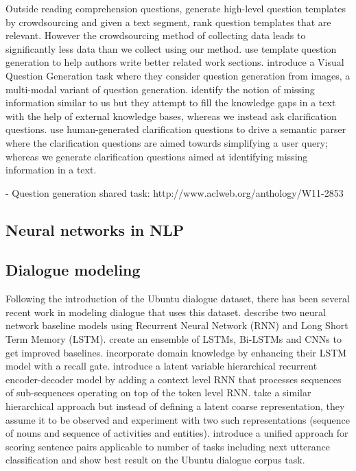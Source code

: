 \documentclass[11pt]{article}
\begin{document}
Outside reading comprehension questions, \cite{labutov2015deep} generate high-level question templates by crowdsourcing and given a text segment, rank question templates that are relevant. However the crowdsourcing method of collecting data leads to significantly less data than we collect using our method. \cite{liu2010automatic} use template question generation to help authors write better related work sections. \cite{mostafazadeh2016generating} introduce a Visual Question Generation task where they consider question generation from images, a multi-modal variant of question generation. 
\cite{penas2010filling} identify the notion of missing information similar to us but they attempt to fill the knowledge gaps in a text with the help of external knowledge bases, whereas we instead ask clarification questions. \cite{artzi2011bootstrapping} use human-generated clarification questions to drive a semantic parser where the clarification questions are aimed towards simplifying a user query; whereas we generate clarification questions aimed at  identifying missing information in a text. 

- Question generation shared task: http://www.aclweb.org/anthology/W11-2853

\subsection{Neural networks in NLP}

\subsection{Dialogue modeling}

Following the introduction of the Ubuntu dialogue dataset, there has been several recent work in modeling dialogue that uses this dataset. \cite{DBLP:conf/sigdial/LowePSP15} describe two neural network baseline models using Recurrent Neural Network (RNN) and Long Short Term Memory (LSTM). 
\cite{DBLP:journals/corr/KadlecSK15} create an ensemble of LSTMs, Bi-LSTMs and CNNs to get improved baselines. 
\cite{xu2016incorporating} incorporate domain knowledge by enhancing their LSTM model with a recall gate.
\cite{serban2016hierarchical} introduce a latent variable hierarchical recurrent encoder-decoder model by adding a context level RNN that processes sequences of sub-sequences operating on top of the token level RNN.
\cite{serban2016multiresolution} take a similar hierarchical approach but instead of defining a latent coarse representation, they assume it to be observed and experiment with two such representations (sequence of nouns and sequence of activities and entities).
\cite{baudivs2016sentence} introduce a unified approach for scoring sentence pairs applicable to number of tasks including next utterance classification and show best result on the Ubuntu dialogue corpus task. 
\end{document}
